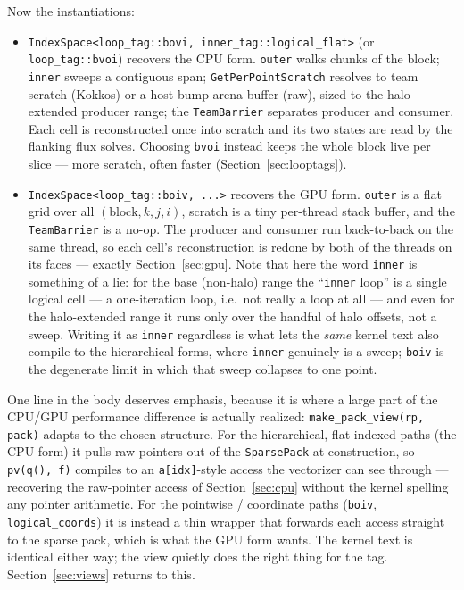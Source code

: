 \documentclass[11pt]{article}
\newcommand{\code}[1]{\lstinline[basicstyle=\ttfamily]|#1|}
\begin{document}
Now the instantiations:
\begin{itemize}
\item \code{IndexSpace<loop_tag::bovi, inner_tag::logical_flat>} (or
  \code{loop_tag::bvoi}) recovers the CPU form. \code{outer} walks chunks of the
  block; \code{inner} sweeps a contiguous span; \code{GetPerPointScratch} resolves
  to team scratch (Kokkos) or a host bump-arena buffer (raw), sized to the
  halo-extended producer range; the \code{TeamBarrier} separates producer and
  consumer. Each cell is reconstructed once into scratch and its two states are
  read by the flanking flux solves. Choosing \code{bvoi} instead keeps the whole
  block live per slice --- more scratch, often faster (Section~\ref{sec:looptags}).
\item \code{IndexSpace<loop_tag::boiv, ...>} recovers the GPU form. \code{outer}
  is a flat grid over all $(\text{block},k,j,i)$, scratch is a tiny per-thread
  stack buffer, and the \code{TeamBarrier} is a no-op. The producer and consumer
  run back-to-back on the same thread, so each cell's reconstruction is redone by
  both of the threads on its faces --- exactly Section~\ref{sec:gpu}. Note that here the word
  \code{inner} is something of a lie: for the base (non-halo) range the
  ``\code{inner} loop'' is a single logical cell --- a one-iteration loop, i.e.\
  not really a loop at all --- and even for the halo-extended range it runs only
  over the handful of halo offsets, not a sweep. Writing it as \code{inner}
  regardless is what lets the \emph{same} kernel text also compile to the
  hierarchical forms, where \code{inner} genuinely is a sweep; \code{boiv} is the
  degenerate limit in which that sweep collapses to one point.
\end{itemize}

One line in the body deserves emphasis, because it is where a large part of the
CPU/GPU performance difference is actually realized:
\code{make_pack_view(rp, pack)} adapts to the chosen structure. For the
hierarchical, flat-indexed paths (the CPU form) it pulls raw pointers out of the
\code{SparsePack} at construction, so \code{pv(q(), f)} compiles to an
\code{a[idx]}-style access the vectorizer can see through --- recovering the
raw-pointer access of Section~\ref{sec:cpu} without the kernel spelling any
pointer arithmetic. For the pointwise / coordinate paths
(\code{boiv}, \code{logical_coords}) it is instead a thin wrapper that forwards
each access straight to the sparse pack, which is what the GPU form wants. The
kernel text is identical either way; the view quietly does the right thing for the
tag. Section~\ref{sec:views} returns to this.
\end{document}
